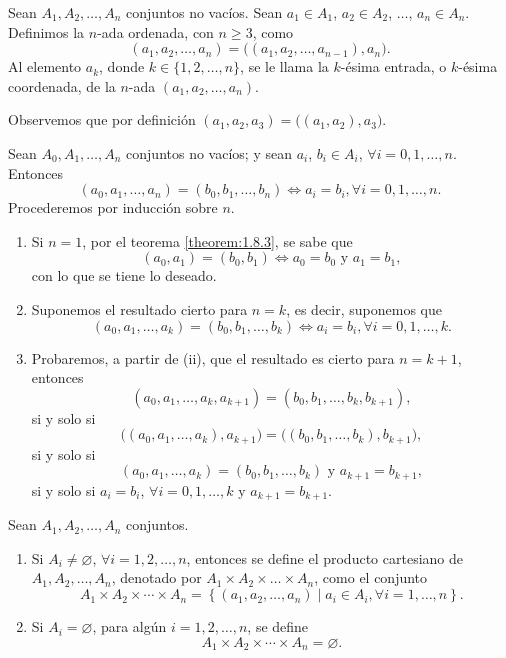 \newpage

\begin{definicion}{}{}
    Sean $A_1, A_2, \dots, A_n$ conjuntos no vacíos. Sean $a_1 \in A_1$, $a_2 \in A_2$, $\dots$, $a_n \in A_n$. Definimos la $n$-ada ordenada, con $n \geq 3$, como
    $$(a_1, a_2, \dots, a_n) = \big((a_1, a_2, \dots, a_{n-1}),  a_n\big).$$
    Al elemento $a_k$, donde $k \in \{1, 2, \dots, n\}$, se le llama la $k$-ésima entrada, o $k$-ésima coordenada, de la $n$-ada $(a_1, a_2, \dots, a_n)$.
\end{definicion}

Observemos que por definición $(a_1, a_2, a_3) = \big((a_1, a_2), a_3\big)$.

\begin{prop}{}{}
    Sean $A_0, A_1, \dots, A_n$ conjuntos no vacíos; y sean $a_i$, $b_i \in A_i$, $\forall i = 0, 1, \dots, n$. Entonces
    $$(a_0, a_1, \dots,  a_n) = (b_0,  b_1,  \dots,  b_n) \Longleftrightarrow a_i = b_i, \forall i = 0, 1, \dots, n.$$
    \tcblower
    \demostracion Procederemos por inducción sobre $n$.
    \begin{enumerate}[label=\roman*., topsep=6pt, itemsep=0pt]
        \item Si $n = 1$, por el teorema \ref{theorem:1.8.3}, se sabe que
        $$(a_0, a_1) = (b_0, b_1) \Longleftrightarrow a_0 = b_0 \text{ y } a_1 = b_1,$$
        con lo que se tiene lo deseado.
        \item Suponemos el resultado cierto para $n = k$, es decir, suponemos que
        $$(a_0, a_1, \dots,  a_k) = (b_0, b_1, \dots, b_k) \Longleftrightarrow a_i = b_i,  \forall i = 0, 1, \dots, k.$$
        \item Probaremos, a partir de (ii), que el resultado es cierto para $n = k+1$, entonces
        $$(a_0, a_1, \dots, a_k,  a_{k+1}) = (b_0, b_1, \dots, b_k,  b_{k+1}),$$
        si y solo si
        $$\big( (a_0, a_1, \dots, a_k),  a_{k+1}\big) = \big( (b_0, b_1, \dots, b_k), b_{k+1}\big),$$
        si y solo si
        $$(a_0, a_1, \dots, a_k) = (b_0, b_1, \dots, b_k) \text{ y } a_{k+1} = b_{k+1},$$
        si y solo si $a_i = b_i$, $\forall i=0, 1, \dots, k \text{ y } a_{k+1} = b_{k+1}$.
    \end{enumerate}
\end{prop}

\begin{definicion}{}{}
    Sean $A_1, A_2, \dots, A_n$ conjuntos.
    \begin{enumerate}[label=\roman*., topsep=6pt, itemsep=0pt]
        \item Si $A_i \neq \varnothing$, $\forall i = 1, 2, \dots, n$, entonces se define el producto cartesiano de $A_1, A_2, \dots, A_n$, denotado por $A_1 \times A_2 \times \dots \times A_n$, como el conjunto
        $$A_1 \times A_2 \times \cdots \times A_n = \left\{(a_1, a_2, \dots, a_n) \mid a_i \in A_i,  \forall i = 1, \dots, n\right\}.$$
        \item Si $A_i = \varnothing$, para algún $i=1, 2, \dots, n$, se define
        $$A_1 \times A_2 \times \cdots \times A_n = \varnothing.$$
    \end{enumerate}
\end{definicion}

